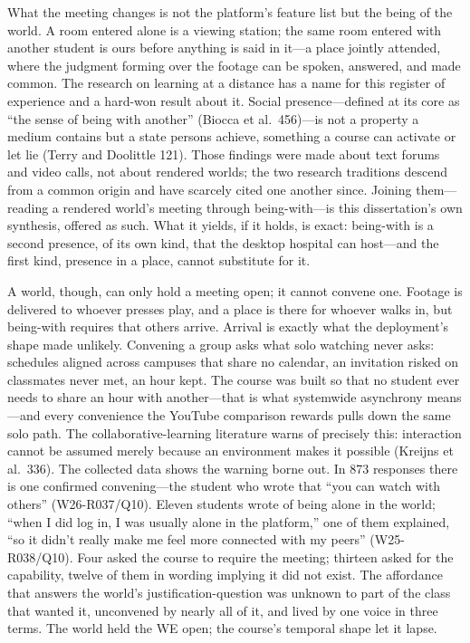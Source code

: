 What the meeting changes is not the platform's feature list but the
being of the world. A room entered alone is a viewing station; the
same room entered with another student is ours before anything is said
in it---a place jointly attended, where the judgment forming over the
footage can be spoken, answered, and made common. The research on
learning at a distance has a name for this register of experience and
a hard-won result about it. Social presence---defined at its core as
``the sense of being with another'' (Biocca et al.\ 456)---is not a
property a medium contains but a state persons achieve, something a
course can activate or let lie (Terry and Doolittle 121). Those
findings were made about text forums and video calls, not about
rendered worlds; the two research traditions descend from a common
origin and have scarcely cited one another since. Joining
them---reading a rendered world's meeting through being-with---is this
dissertation's own synthesis, offered as such. What it yields, if it
holds, is exact: being-with is a second presence, of its own kind,
that the desktop hospital can host---and the first kind, presence in a
place, cannot substitute for it.

A world, though, can only hold a meeting open; it cannot convene one.
Footage is delivered to whoever presses play, and a place is there for
whoever walks in, but being-with requires that others arrive. Arrival
is exactly what the deployment's shape made unlikely. Convening a
group asks what solo watching never asks: schedules aligned across
campuses that share no calendar, an invitation risked on classmates
never met, an hour kept. The course was built so that no student ever
needs to share an hour with another---that is what systemwide
asynchrony means---and every convenience the YouTube comparison
rewards pulls down the same solo path. The collaborative-learning
literature warns of precisely this: interaction cannot be assumed
merely because an environment makes it possible (Kreijns et al.\ 336).
The collected data shows the warning borne out. In 873 responses there
is one confirmed convening---the student who wrote that ``you can
watch with others'' (W26-R037/Q10). Eleven students wrote of being
alone in the world; ``when I did log in, I was usually alone in the
platform,'' one of them explained, ``so it didn't really make me feel
more connected with my peers'' (W25-R038/Q10). Four asked the course
to require the meeting; thirteen asked for the capability, twelve of
them in wording implying it did not exist. The affordance that answers
the world's justification-question was unknown to part of the class
that wanted it, unconvened by nearly all of it, and lived by one voice
in three terms. The world held the WE open; the course's temporal
shape let it lapse.

